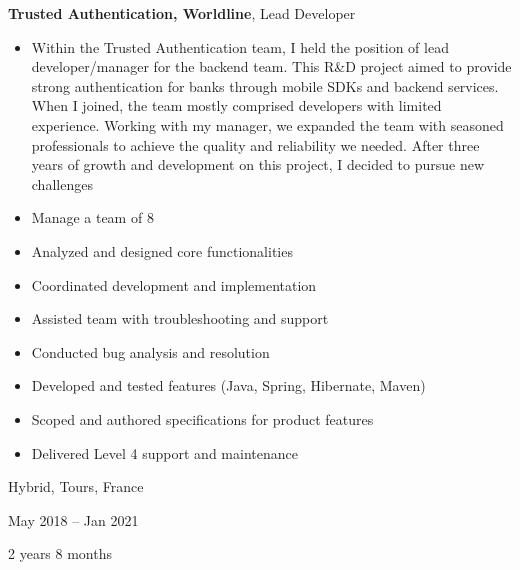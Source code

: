 \documentclass[10pt, letterpaper]{article}
\newenvironment{highlights}{
    \begin{itemize}[
        topsep=0.10 cm,
        parsep=0.10 cm,
        partopsep=0pt,
        itemsep=0pt,
        leftmargin=0.4 cm + 10pt
    ]
}{
    \end{itemize}
} %
\newenvironment{twocolentry}[2][]{
    \onecolentry
    \def\secondColumn{#2}
    \setcolumnwidth{\fill, 4.5 cm}
    \begin{paracol}{2}
}{
    \switchcolumn \raggedleft \secondColumn
    \end{paracol}
    \endonecolentry
} %
\begin{document}
        \begin{twocolentry}{
            Hybrid, Tours, France

        May 2018 – Jan 2021

        2 years 8 months
        }
            \textbf{Trusted Authentication, Worldline}, Lead Developer
            \begin{highlights}
                \item Within the Trusted Authentication team, I held the position of lead developer/manager for the backend team. This R\&D project aimed to provide strong authentication for banks through mobile SDKs and backend services. When I joined, the team mostly comprised developers with limited experience. Working with my manager, we expanded the team with seasoned professionals to achieve the quality and reliability we needed. After three years of growth and development on this project, I decided to pursue new challenges
                \item Manage a team of 8
                \item Analyzed and designed core functionalities
                \item Coordinated development and implementation
                \item Assisted team with troubleshooting and support
                \item Conducted bug analysis and resolution
                \item Developed and tested features (Java, Spring, Hibernate, Maven)
                \item Scoped and authored specifications for product features
                \item Delivered Level 4 support and maintenance
            \end{highlights}
        \end{twocolentry}


        \vspace{0.2 cm}
\end{document}

